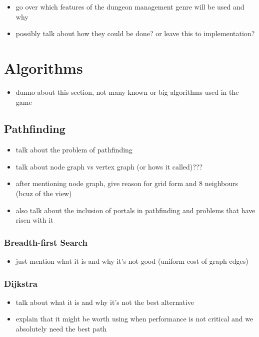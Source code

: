 \begin{itemize}
    \item go over which features of the dungeon management genre will be used and why
    \item possibly talk about how they could be done? or leave this to implementation?
\end{itemize}

\section{Algorithms}

\begin{itemize}
    \item dunno about this section, not many known or big
        algorithms used in the game
\end{itemize}

\subsection{Pathfinding}

\begin{itemize}
    \item talk about the problem of pathfinding
    \item talk about node graph vs vertex graph (or hows it called)???
    \item after mentioning node graph, give reason for grid form
	    and 8 neighbours (bcuz of the view)
    \item also talk about the inclusion of portals in pathfinding
	    and problems that have risen with it
\end{itemize}

\subsubsection{Breadth-first Search}

\begin{itemize}
    \item just mention what it is and why it's not good
	    (uniform cost of graph edges)
\end{itemize}

\subsubsection{Dijkstra}

\begin{itemize}
    \item talk about what it is and why it's not the best alternative
    \item explain that it might be worth using when performance is
	    not critical and we absolutely need the best path
\end{itemize}

